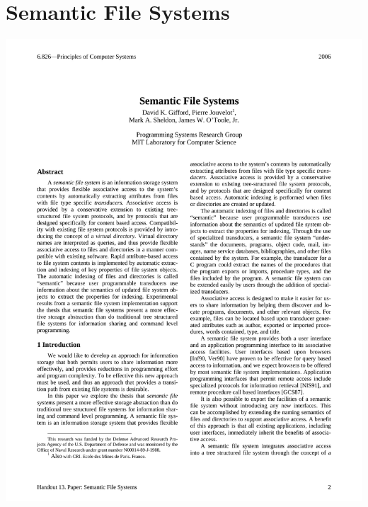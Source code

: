 \section{Semantic File Systems}
\hspace*{-1.5cm}
\includegraphics[page=1,scale=0.75]{./appendix/SEMFS.pdf}
	

